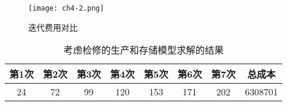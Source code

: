 \begin{figure}[H]
    \centering
    \texttt{[image: ch4-2.png]}
    \caption{迭代费用对比}
    \label{f.ch4-2}
\end{figure}


\begin{table}[!hpt]
    \caption{考虑检修的生产和存储模型求解的结果}
    \label{T.ch4-1}
    \centering
    \renewcommand\arraystretch{1.5} 
    \begin{tabular}{@{}cccccccc@{}} 
    \toprule
    \textbf{第1次} & \textbf{第2次} & \textbf{第3次} & \textbf{第4次} & \textbf{第5次} & \textbf{第6次} & \textbf{第7次} & \textbf{总成本} \\
    \midrule
    24  & 72 & 99 & 120 & 153 & 171 & 202 & 6308701 \\
    \bottomrule
    \end{tabular}
\end{table}

